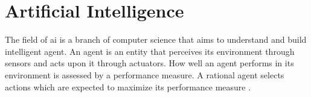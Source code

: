 \section{Artificial Intelligence}
\label{sec:theoretical_background:ai}

The field of \acrlong{ai} is a branch of computer science that aims to understand and build intelligent agent.
An agent is an entity that perceives its environment through sensors and acts upon it through actuators.
How well an agent performs in its environment is assessed by a performance measure.
A rational agent selects actions which are expected to maximize its performance measure \cite[p.~1--37]{ai}.
